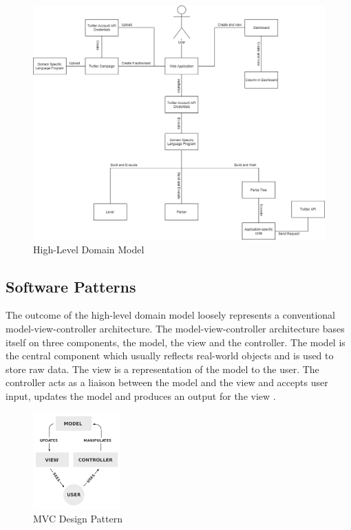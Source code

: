 \begin{figure}[H]
  \centering
  \includegraphics[width=1\textwidth]{images/high-level-domain.png}
  \caption{High-Level Domain Model}
\end{figure}

\subsection{Software Patterns}

The outcome of the high-level domain model loosely represents a conventional model-view-controller architecture. The model-view-controller architecture bases itself on three components, the model, the view and the controller. The model is the central component which usually reflects real-world objects and is used to store raw data. The view is a representation of the model to the user. The controller acts as a liaison between the model and the view and accepts user input, updates the model and produces an output for the view \cite{deacon2009model}. 

\begin{figure}[H]
  \centering
  \includegraphics[width=0.3\textwidth]{images/mvc.png}
  \caption{MVC Design Pattern \cite{mvc}}
\end{figure}

